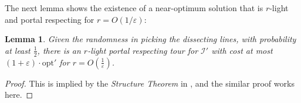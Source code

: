 \documentclass[10pt,a4paper]{amsart}
\theoremstyle{thmstyleone}
\newtheorem{lemma}{Lemma}
\newcommand{\eps}{\varepsilon}
\newcommand{\opt}{{\text{opt}}}
\newcommand{\OPT}{{\text{OPT}}}
\begin{document}
The next lemma shows the existence of a near-optimum solution that is 
$r$-light and portal respecting for $r=O(1/\eps)$:
\begin{lemma}\label{lemma:p-tour-r-light}
    Given the randomness in picking the dissecting lines, with probability at least $\frac 12$, there is an $r$-light portal respecting tour for $\mathcal I'$ with cost at most $(1+\eps)\cdot \opt'$ for 
    $r = O(\frac{1}\eps)$.
\end{lemma}
\begin{proof}
    This is implied by the {\em Structure Theorem} in \cite{Arora98}, and the similar proof works here.
    

\end{proof}
\end{document}
